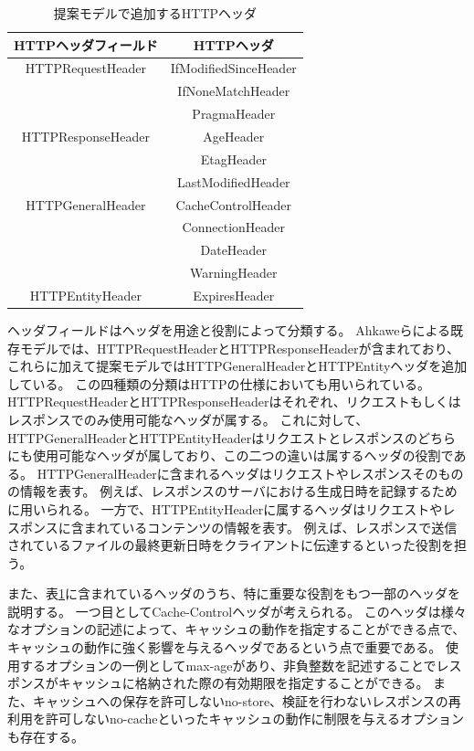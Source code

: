\documentclass{css}
\begin{document}
\begin{table}[htb]
\centering
\caption{提案モデルで追加するHTTPヘッダ}
\label{tb:model_header}
\begin{tabular}{c|c}
\hline
HTTPヘッダフィールド & HTTPヘッダ \\ \hline \hline
HTTPRequestHeader & IfModifiedSinceHeader \\
 & IfNoneMatchHeader \\
 & PragmaHeader \\ \hline
HTTPResponseHeader & AgeHeader \\
　& EtagHeader \\
 & LastModifiedHeader \\ \hline
HTTPGeneralHeader & CacheControlHeader \\
 & ConnectionHeader \\
 & DateHeader \\
 & WarningHeader \\ \hline
HTTPEntityHeader & ExpiresHeader \\ \hline
\end{tabular}
\end{table}

ヘッダフィールドはヘッダを用途と役割によって分類する。
Ahkaweらによる既存モデル\cite{webmodel}では、HTTPRequestHeaderとHTTPResponseHeaderが含まれており、これらに加えて提案モデルではHTTPGeneralHeaderとHTTPEntityヘッダを追加している。
この四種類の分類はHTTPの仕様においても用いられている。
HTTPRequestHeaderとHTTPResponseHeaderはそれぞれ、リクエストもしくはレスポンスでのみ使用可能なヘッダが属する。
これに対して、HTTPGeneralHeaderとHTTPEntityHeaderはリクエストとレスポンスのどちらにも使用可能なヘッダが属しており、この二つの違いは属するヘッダの役割である。
HTTPGeneralHeaderに含まれるヘッダはリクエストやレスポンスそのものの情報を表す。
例えば、レスポンスのサーバにおける生成日時を記録するために用いられる。
一方で、HTTPEntityHeaderに属するヘッダはリクエストやレスポンスに含まれているコンテンツの情報を表す。
例えば、レスポンスで送信されているファイルの最終更新日時をクライアントに伝達するといった役割を担う。

また、表\ref{tb:model_header}に含まれているヘッダのうち、特に重要な役割をもつ一部のヘッダを説明する。
一つ目としてCache-Controlヘッダが考えられる。
このヘッダは様々なオプションの記述によって、キャッシュの動作を指定することができる点で、キャッシュの動作に強く影響を与えるヘッダであるという点で重要である。
使用するオプションの一例としてmax-ageがあり、非負整数を記述することでレスポンスがキャッシュに格納された際の有効期限を指定することができる。
また、キャッシュへの保存を許可しないno-store、検証を行わないレスポンスの再利用を許可しないno-cacheといったキャッシュの動作に制限を与えるオプションも存在する。
\end{document}
